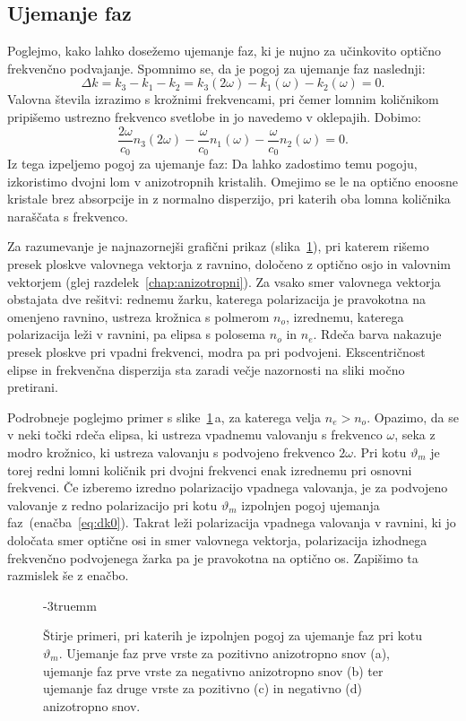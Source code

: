 \subsection*{Ujemanje faz}
Poglejmo, kako lahko dosežemo ujemanje faz, ki je nujno za učinkovito optično
frekvenčno podvajanje. Spomnimo se, da je pogoj za ujemanje faz naslednji:
\begin{equation}
\Delta k = k_3 - k_1 -k_2 = k_3(2\omega) - k_1(\omega) -k_2(\omega) = 0.
\end{equation}
Valovna števila izrazimo s krožnimi frekvencami, pri čemer 
lomnim količnikom pripišemo ustrezno frekvenco svetlobe in jo navedemo v oklepajih. Dobimo:
\begin{equation}
\frac{2\omega}{c_0} n_3(2\omega) - \frac{\omega}{c_0} n_1(\omega)- \frac{\omega}{c_0} n_2(\omega) =0.
\end{equation}
Iz tega izpeljemo pogoj za ujemanje faz:
Da lahko zadostimo temu pogoju, izkoristimo dvojni lom v 
anizotropnih kristalih. Omejimo se le na optično 
enoosne kristale brez absorpcije in z 
normalno disperzijo, pri katerih oba lomna količnika naraščata s frekvenco.  

Za razumevanje je najnazornejši grafični prikaz (slika~\ref{fig:dk}), pri katerem
rišemo presek ploskve valovnega vektorja z ravnino, določeno z optično osjo in valovnim
vektorjem (glej razdelek~\ref{chap:anizotropni}). 
Za vsako smer valovnega vektorja obstajata dve rešitvi:
rednemu žarku, katerega polarizacija je pravokotna na omenjeno ravnino,
ustreza krožnica s polmerom $n_o$, izrednemu, katerega polarizacija leži v ravnini, 
pa elipsa s polosema $n_o$ in $n_e$. 
Rdeča barva nakazuje presek ploskve pri vpadni frekvenci, modra pa pri podvojeni. 
Ekscentričnost elipse in frekvenčna disperzija sta zaradi večje nazornosti na sliki 
močno pretirani. 

Podrobneje poglejmo primer s slike~\ref{fig:dk}\,a, za katerega velja $n_e>n_o$. 
Opazimo, da se v neki točki rdeča elipsa, ki ustreza vpadnemu valovanju s frekvenco $\omega$, 
seka z modro krožnico, ki ustreza valovanju s podvojeno frekvenco $2\omega$. Pri kotu 
$\vartheta_m$ je torej redni lomni 
količnik pri dvojni frekvenci enak izrednemu pri osnovni
frekvenci. Če izberemo izredno polarizacijo vpadnega valovanja, je za podvojeno 
valovanje z redno polarizacijo pri kotu $\vartheta_m$ izpolnjen pogoj ujemanja 
faz~(enačba~\ref{eq:dk0}). Takrat leži polarizacija vpadnega valovanja v ravnini,
ki jo določata smer optične osi in smer valovnega vektorja, polarizacija 
izhodnega frekvenčno podvojenega žarka pa 
je pravokotna na optično os. Zapišimo ta razmislek še z enačbo.
\begin{figure}[ht]
\centering
\def\svgwidth{128truemm} 

\caption{Štirje primeri, pri katerih je izpolnjen pogoj za ujemanje faz pri kotu $\vartheta_m$. 
Ujemanje faz prve vrste za pozitivno anizotropno snov (a), 
ujemanje faz prve vrste za negativno anizotropno snov (b) ter 
ujemanje faz druge vrste za pozitivno (c) in negativno (d) anizotropno snov.}
\label{fig:dk}
\vglue-3truemm
\end{figure}

